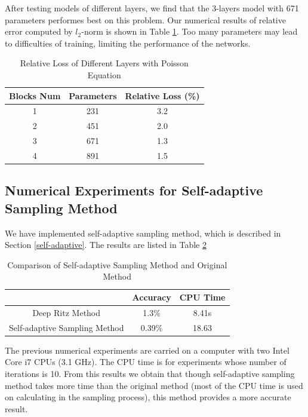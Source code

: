 \documentclass{article}
\begin{document}
\par After testing models of different layers, we find that the 3-layers model with 671 parameters performes best on this problem. Our numerical results of relative error computed by $l_2$-norm is shown in Table \ref{different layers of poisson equation}. Too many parameters may lead to difficulties of training, limiting the performance of the networks.

\begin{table}
\centering  
\caption{Relative Loss of Different Layers with Poisson Equation}
\label{different layers of poisson equation}
\begin{tabular}{ccc} 
	\toprule
	Blocks Num & Parameters & Relative Loss (\%) \\
	\hline
	1 & 231 & 3.2\\
	\hline
	2 & 451 & 2.0\\
	\hline
	3 & 671 & 1.3\\
	\hline
	4 & 891 & 1.5\\
	\bottomrule
\end{tabular}
\end{table}

\subsection{Numerical Experiments for Self-adaptive Sampling Method}
\par We have implemented self-adaptive sampling method, which is described in Section \ref{self-adaptive}. The results are listed in Table \ref{adaptive experiments}
\begin{table}
	\centering
	\caption{Comparison of Self-adaptive Sampling Method and Original Method}
	\label{adaptive experiments}
	\begin{tabular}{ccc}
		\toprule
		& Accuracy & CPU Time\\
		\hline
		Deep Ritz Method & 1.3\% & 8.41s\\
		\hline
		Self-adaptive Sampling Method & 0.39\% & 18.63\\
		\bottomrule
	\end{tabular}
\end{table}
\par The previous numerical experiments are carried on a computer with two Intel Core i7 CPUs (3.1 GHz). The CPU time is for experiments whose number of iterations is 10. From this results we obtain that though self-adaptive sampling method takes more time than the original method (most of the CPU time is used on calculating in the sampling process), this method provides a more accurate result. 
\end{document}
